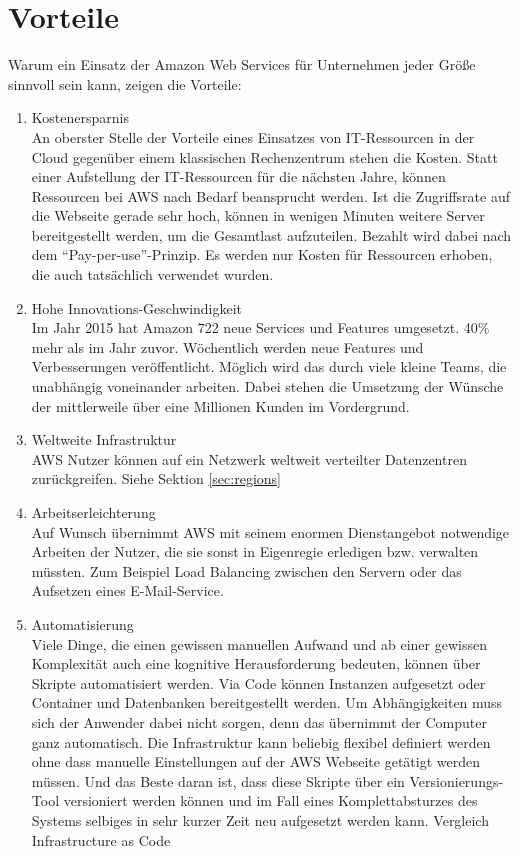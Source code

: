 {\section{Vorteile}
\label{sec:vorteile}
Warum ein Einsatz der Amazon Web Services für Unternehmen jeder Größe sinnvoll sein kann, zeigen die Vorteile:
\begin{enumerate}
  \item Kostenersparnis
  \\ An oberster Stelle der Vorteile eines Einsatzes von IT-Ressourcen in der Cloud gegenüber einem klassischen Rechenzentrum stehen die Kosten. Statt einer Aufstellung der IT-Ressourcen für die nächsten Jahre, können Ressourcen bei AWS nach Bedarf beansprucht werden. Ist die Zugriffsrate auf die Webseite gerade sehr hoch, können in wenigen Minuten weitere Server bereitgestellt werden, um die Gesamtlast aufzuteilen. Bezahlt wird dabei nach dem "`Pay-per-use"'-Prinzip. Es werden nur Kosten für Ressourcen erhoben, die auch tatsächlich verwendet wurden.
  \item Hohe Innovations-Geschwindigkeit
  \\ Im Jahr 2015 hat Amazon 722 neue Services und Features umgesetzt. 40\% mehr als im Jahr zuvor. Wöchentlich werden neue Features und Verbesserungen veröffentlicht. Möglich wird das durch viele kleine Teams, die unabhängig voneinander arbeiten. Dabei stehen die Umsetzung der Wünsche der mittlerweile über eine Millionen Kunden im Vordergrund.
  \item Weltweite Infrastruktur
  \\ AWS Nutzer können auf ein Netzwerk weltweit verteilter Datenzentren zurückgreifen. Siehe Sektion \ref{sec:regions}
  \item Arbeitserleichterung
  \\ Auf Wunsch übernimmt AWS mit seinem enormen Dienstangebot notwendige Arbeiten der Nutzer, die sie sonst in Eigenregie erledigen bzw. verwalten müssten. Zum Beispiel Load Balancing zwischen den Servern oder das Aufsetzen eines E-Mail-Service.
  \item Automatisierung
  \\ Viele Dinge, die einen gewissen manuellen Aufwand und ab einer gewissen Komplexität auch eine kognitive Herausforderung bedeuten, können über Skripte automatisiert werden. Via Code können Instanzen aufgesetzt oder Container und Datenbanken bereitgestellt werden. Um Abhängigkeiten muss sich der Anwender dabei nicht sorgen, denn das übernimmt der Computer ganz automatisch. Die Infrastruktur kann beliebig flexibel definiert werden ohne dass manuelle Einstellungen auf der AWS Webseite getätigt werden müssen. Und das Beste daran ist, dass diese Skripte über ein Versionierungs-Tool versioniert werden können und im Fall eines Komplettabsturzes des Systems selbiges in sehr kurzer Zeit neu aufgesetzt werden kann. {\color{red}Vergleich Infrastructure as Code}

\end{enumerate}}
